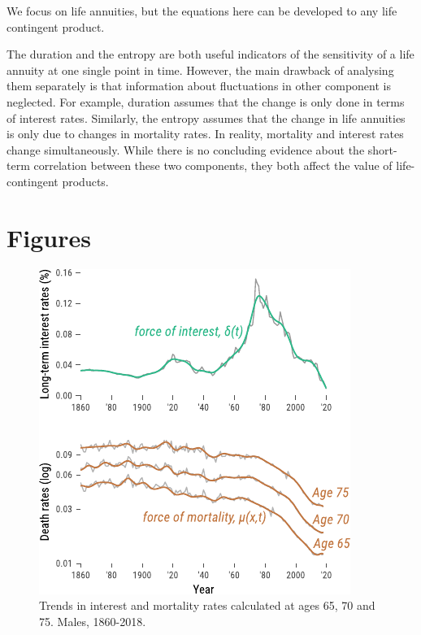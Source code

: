 \documentclass[12pt]{article}
\begin{document}
We focus on life annuities, but the equations here can be developed to any life contingent product.


The duration and the entropy are both useful indicators of the sensitivity of a life annuity at one single point in time. However, the main drawback of analysing them separately is that information about fluctuations in other component is neglected. For example, duration assumes that the change is only done in terms of interest rates. Similarly, the entropy assumes that the change in life annuities is only due to changes in mortality rates. In reality, mortality and interest rates change simultaneously. While there is no concluding evidence about the short-term correlation between these two components, they both affect the value of life-contingent products.


\newpage


%
%



\newpage

\FloatBarrier
\section{Figures}

\begin{figure}[!ht]
	\centering
	\includegraphics[width=0.5\linewidth]{Fig/deltamu}
	\caption{{Trends in interest and mortality rates calculated at ages 65, 70 and 75. Males, 1860-2018.}}
	\label{fig:Fig1}
\end{figure}
\end{document}
